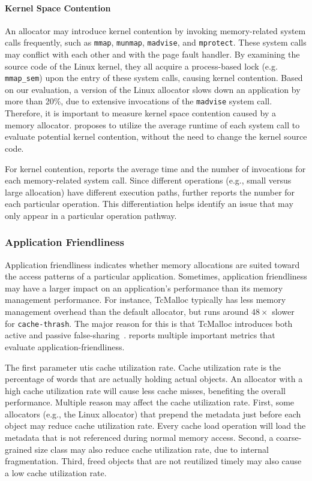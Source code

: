 \paragraph{Kernel Space Contention} 
 An allocator may introduce kernel contention by invoking memory-related system calls frequently, such as \texttt{mmap}, \texttt{munmap}, \texttt{madvise}, and \texttt{mprotect}. These system calls may conflict with each other and with the page fault handler. By examining the source code of the Linux kernel, they all acquire a process-based lock (e.g. \texttt{mmap\_sem}) upon the entry of these system calls, causing kernel contention. Based on our evaluation, a version of the Linux allocator slows down an application by more than 20\%, due to extensive invocations of the \texttt{madvise} system call. Therefore, it is important to measure kernel space contention caused by a memory allocator. \MP{} proposes to utilize the average runtime of each system call to evaluate potential kernel contention, without the need to change the kernel source code.

For kernel contention, \MP{} reports the average time and the number of invocations for each memory-related system call. Since different operations (e.g., small versus large allocation) have different execution paths, \MP{} further reports the number for each particular operation. This differentiation helps identify an issue that may only appear in a particular operation pathway. 

\subsubsection{Application Friendliness}
\label{sec: friendliness}

Application friendliness indicates whether memory allocations are suited toward the access patterns of a particular application. Sometimes, application friendliness may have a larger impact on an application's performance than its memory management performance. For instance, TcMalloc typically has less memory management overhead than the default allocator, but runs around $48\times$ slower for \texttt{cache-thrash}. The major reason for this is that TcMalloc introduces both active and passive false-sharing~\cite{tcmallocsharing}. \MP{} reports multiple important metrics that evaluate application-friendliness.


The first parameter utis cache utilization rate. Cache utilization rate is the percentage of words that are actually holding actual objects. An allocator with a high cache utilization rate will cause less cache misses, benefiting the overall performance. Multiple reason may affect the cache utilization rate. First, some allocators (e.g., the Linux allocator) that prepend the metadata just before each object may reduce  cache utilization rate. Every cache load operation will load the metadata that is not referenced during normal memory access. 
 Second, a coarse-grained size class may also reduce cache utilization rate, due to internal fragmentation. Third, freed objects that are not reutilized timely may also cause a low cache utilization rate. 

